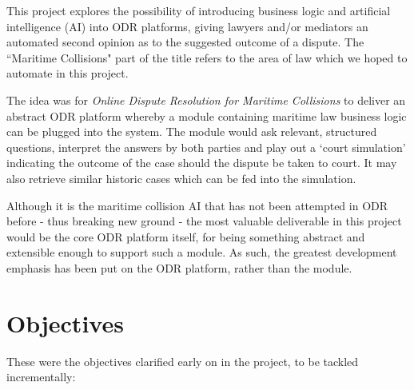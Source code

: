 This project explores the possibility of introducing business logic and artificial intelligence (AI) into ODR platforms, giving lawyers and/or mediators an automated second opinion as to the suggested outcome of a dispute. The ``Maritime Collisions" part of the title refers to the area of law which we hoped to automate in this project.

The idea was for \emph{Online Dispute Resolution for Maritime Collisions} to deliver an abstract ODR platform whereby a module containing maritime law business logic can be plugged into the system. The module would ask relevant, structured questions, interpret the answers by both parties and play out a `court simulation' indicating the outcome of the case should the dispute be taken to court. It may also retrieve similar historic cases which can be fed into the simulation.

Although it is the maritime collision AI that has not been attempted in ODR before - thus breaking new ground - the most valuable deliverable in this project would be the core ODR platform itself, for being something abstract and extensible enough to support such a module. As such, the greatest development emphasis has been put on the ODR platform, rather than the module.

\section{Objectives}

These were the objectives clarified early on in the project, to be tackled incrementally:

